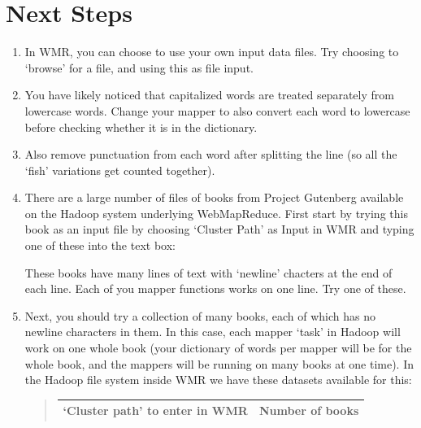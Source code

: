 \documentclass[letterpaper,10pt,openany,oneside]{sphinxmanual}
\begin{document}
\section{Next Steps}
\label{wmr_basic/wmr_multi_language:next-steps}\begin{enumerate}
\item {} 
In WMR, you can choose to use your own input data files. Try
choosing to `browse' for a file, and using this
 as file
input.

\item {} 
You have likely noticed that capitalized words are treated
separately from lowercase words. Change your mapper to also convert
each word to lowercase before checking whether it is in the
dictionary.

\item {} 
Also remove punctuation from each word after splitting the line
(so all the `fish' variations get counted together).

\item {} 
There are a large number of files of books from Project
Gutenberg available on the Hadoop system underlying WebMapReduce.
First start by trying this book as an input file by choosing
`Cluster Path' as Input in WMR and typing one of these into the
text box:


These books have many lines of text with `newline' chacters at the
end of each line. Each of you mapper functions works on one line.
Try one of these.

\item {} 
Next, you should try a collection of many books, each of which
has no newline characters in them. In this case, each mapper `task'
in Hadoop will work on one whole book (your dictionary of words per
mapper will be for the whole book, and the mappers will be running
on many books at one time). In the Hadoop file system inside WMR we
have these datasets available for this:
\begin{quote}

\begin{tabulary}{\linewidth}{|L|L|}
\hline
\textbf{
`Cluster path' to enter in WMR
} & \textbf{
Number of books
}\\\hline


\end{tabulary}
\end{quote}
\end{enumerate}
\end{document}
